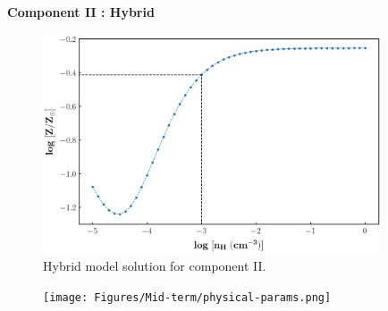 {}\begin{frame}{\textbf{Component II : Hybrid}}\markdownRendererInterblockSeparator
{}\vspace{-5mm}\markdownRendererInterblockSeparator
{}\markdownRendererInterblockSeparator
{}\end{frame}\markdownRendererInterblockSeparator
{}\begin{frame}{}\markdownRendererInterblockSeparator
{}\begin{figure}[!htbp] \centering \includegraphics[width=10cm]{Figures/Mid-term/comp-II-CIE.png} \vspace*{-1mm} \caption{Hybrid model solution for component II.} \end{figure}\markdownRendererInterblockSeparator
{}\end{frame}\markdownRendererInterblockSeparator
{}\begin{frame}[noframenumbering]{}\markdownRendererInterblockSeparator
{}\begin{figure}[!htbp] \centering \texttt{[image: Figures/Mid-term/physical-params.png]} \end{figure}\markdownRendererInterblockSeparator
{}\end{frame}\markdownRendererInterblockSeparator
